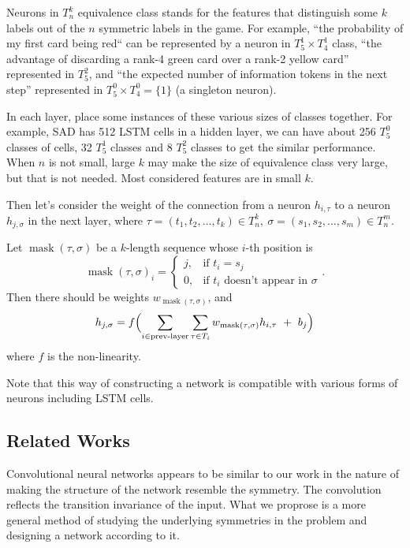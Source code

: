 \documentclass[12pt]{article}
\begin{document}
\begin{spacing}{1.15}
Neurons in $T_n^k$ equivalence class stands for the features that distinguish some $k$ labels out of the $n$ symmetric labels in the game. For example, ``the probability of my first card being red`` can be represented by a neuron in $T_5^1\times T_4^1$ class, ``the advantage of discarding a rank-4 green card over a rank-2 yellow card'' represented in $T_5^2$, and ``the expected number of information tokens in the next step'' represented in $T_5^0\times T_4^0=\{1\}$ (a singleton neuron).

In each layer, place some instances of these various sizes of classes together. For example, SAD has 512 LSTM cells in a hidden layer, we can have about 256 $T_5^0$ classes of cells, 32 $T_5^1$ classes and 8 $T_5^2$ classes to get the similar performance. When $n$ is not small, large $k$ may make the size of equivalence class very large, but that is not needed. Most considered features are in small $k$.

Then let's consider the weight of the connection from a neuron $h_{i,\tau}$ to a neuron $h_{j,\sigma}$ in the next layer, where $\tau = (t_1,t_2,\dots,t_k) \in T_n^k,~\sigma = (s_1,s_2,\dots,s_m) \in T_n^m$.

\newcommand\mask{\mathop{\mathrm{mask}}}
Let $\mask(\tau,\sigma)$ be a $k$-length sequence whose $i$-th position is
\[\mask(\tau,\sigma)_i = \begin{cases}
  j,&\text{if }t_i=s_j \\
  0,&\text{if }t_i\text{ doesn't appear in }\sigma
\end{cases}.\]
Then there should be weights $w_{\mask(\tau,\sigma)}$, and
\[h_{j,\sigma} = f\Bigl(\sum_{i\in\text{prev-layer}}\sum_{\tau\in T_i}w_{\mask(\tau,\sigma)}h_{i,\tau}~+~b_j\Bigr)\]
where $f$ is the non-linearity.

Note that this way of constructing a network is compatible with various forms of neurons including LSTM cells.

\subsection{Related Works}

Convolutional neural networks appears to be similar to our work in the nature of making the structure of the network resemble the symmetry. The convolution reflects the transition invariance of the input. What we proprose is a more general method of studying the underlying symmetries in the problem and designing a network according to it.


\end{spacing}
\end{document}
